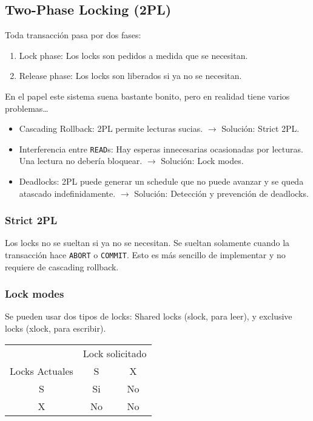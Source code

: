 \subsection{Two-Phase Locking (2PL)}
Toda transacción pasa por dos fases:
\begin{enumerate}
  \item Lock phase: Los locks son pedidos a medida que se necesitan.
  \item Release phase: Los locks son liberados si ya no se necesitan.
\end{enumerate}


En el papel este sistema suena bastante bonito, pero en realidad tiene varios problemas\dots
\begin{itemize}
  \item Cascading Rollback: 2PL permite lecturas sucias. $\rightarrow$ Solución: Strict 2PL.
  \item Interferencia entre \texttt{READ}s: Hay esperas innecesarias ocasionadas por lecturas. Una lectura no debería bloquear. $\rightarrow$ Solución: Lock modes.
  \item Deadlocks: 2PL puede generar un schedule que no puede avanzar y se queda atascado indefinidamente. $\rightarrow$ Solución: Detección y prevención de deadlocks.
\end{itemize}

\subsubsection{Strict 2PL}
Los locks no se sueltan si ya no se necesitan. Se sueltan solamente cuando la transacción hace \texttt{ABORT} o \texttt{COMMIT}. Esto es más sencillo de implementar y no requiere de cascading rollback.

\subsubsection{Lock modes}
Se pueden usar dos tipos de locks: Shared locks (slock, para leer), y exclusive locks (xlock, para escribir).

\begin{center}
  \begin{tabular}{|c|c|c|}
    \hline
     & \multicolumn{2}{c|}{Lock solicitado} \\
    \cline{2-3}
    Locks Actuales & S & X \\
    \hline
    S & Si & No \\
    \hline
    X & No & No \\
    \hline
  \end{tabular}
\end{center}

